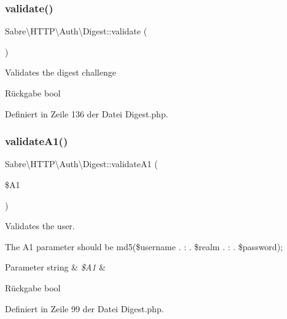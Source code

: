 \subsubsection{\texorpdfstring{validate()}{validate()}}
{\footnotesize\ttfamily Sabre\textbackslash{}\+H\+T\+T\+P\textbackslash{}\+Auth\textbackslash{}\+Digest\+::validate (\begin{DoxyParamCaption}{ }\end{DoxyParamCaption})\hspace{0.3cm}{\ttfamily [protected]}}

Validates the digest challenge

\begin{DoxyReturn}{Rückgabe}
bool 
\end{DoxyReturn}


Definiert in Zeile 136 der Datei Digest.\+php.

\mbox{\label{class_sabre_1_1_h_t_t_p_1_1_auth_1_1_digest_a5598d7b0be03b258c592384cb00aa26b}} 
\subsubsection{\texorpdfstring{validate\+A1()}{validateA1()}}
{\footnotesize\ttfamily Sabre\textbackslash{}\+H\+T\+T\+P\textbackslash{}\+Auth\textbackslash{}\+Digest\+::validate\+A1 (\begin{DoxyParamCaption}\item[{}]{\$\+A1 }\end{DoxyParamCaption})}

Validates the user.

The A1 parameter should be md5(\$username . \textquotesingle{}\+:\textquotesingle{} . \$realm . \textquotesingle{}\+:\textquotesingle{} . \$password);


\begin{DoxyParams}[1]{Parameter}
string & {\em \$\+A1} & \\
\hline
\end{DoxyParams}
\begin{DoxyReturn}{Rückgabe}
bool 
\end{DoxyReturn}


Definiert in Zeile 99 der Datei Digest.\+php.

